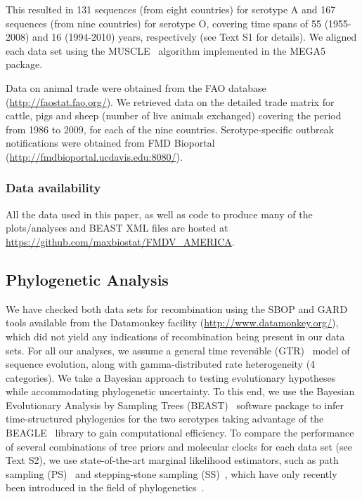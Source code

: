 \documentclass[10pt]{article}
\begin{document}
This resulted in 131 sequences (from eight countries) for serotype A and 167 sequences (from nine countries) for serotype O, covering time spans of 55 (1955-2008) and 16 (1994-2010) years, respectively (see Text S1 for details).
We aligned each data set using the MUSCLE~\citep{Edgar2004} algorithm implemented in the MEGA5~\citep{Tamura2011} package.

Data on animal trade were obtained from the FAO database (\url{http://faostat.fao.org/}).
We retrieved data on the detailed trade matrix for cattle, pigs and sheep (number of live animals exchanged) covering the period from 1986 to 2009, for each of the nine countries.
Serotype-specific outbreak notifications were obtained from FMD Bioportal (\url{http://fmdbioportal.ucdavis.edu:8080/}).

\subsubsection*{Data availability}
All the data used in this paper, as well as code to produce many of the plots/analyses and BEAST XML files are hosted at \url{https://github.com/maxbiostat/FMDV_AMERICA}.

\subsection*{Phylogenetic Analysis}

We have checked both data sets for recombination using the SBOP and GARD~\citep{Kosakovsky2006} tools available from the Datamonkey facility (\url{http://www.datamonkey.org/}), which did not yield any indications of recombination being present in our data sets.
For all our analyses, we assume a general time reversible (GTR)~\citep{Tavare1986} model of sequence evolution, along with gamma-distributed rate heterogeneity (4 categories).
We take a Bayesian approach to testing evolutionary hypotheses while accommodating phylogenetic uncertainty. 
To this end, we use the Bayesian Evolutionary Analysis by Sampling Trees (BEAST)~\citep{Drummond2012} software package to infer time-structured phylogenies for the two serotypes taking advantage of the BEAGLE~\citep{Ayres2012} library to gain computational efficiency.
To compare the performance of several combinations of tree priors and molecular clocks for each data set (see Text S2), we use state-of-the-art marginal likelihood estimators, such as path sampling (PS)~\citep{Lartillot2006} and stepping-stone sampling (SS)~\citep{Xie2011}, which have only recently been introduced in the field of phylogenetics~\citep{Lartillot2006, Xie2011, Baele2012, Baele2013a, Baele2013b, Baele2013c}.
\end{document}
